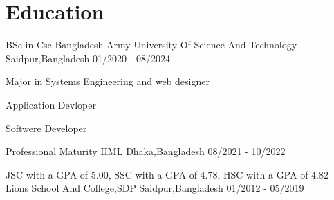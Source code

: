 \vspace{-\acvSectionTopSkip}
\section{Education}
\cventry
{BSc in Csc} %
{Bangladesh Army University Of Science And Technology} %
{Saidpur,Bangladesh} %
{01/2020 - 08/2024} %
\begin{cvitems}
\item {Major in Systems Engineering and web designer}
\item {Application Devloper}
\item {Softwere Developer}

\end{cvitems}

\cventry
{Professional Maturity} %
{IIML} %
{Dhaka,Bangladesh} %
{08/2021 - 10/2022} %

\cventry
{JSC with a GPA of 5.00,
SSC with a GPA of 4.78,
HSC with a GPA of 4.82} %
{Lions School And College,SDP} %
{Saidpur,Bangladesh} %
{01/2012 - 05/2019} %
